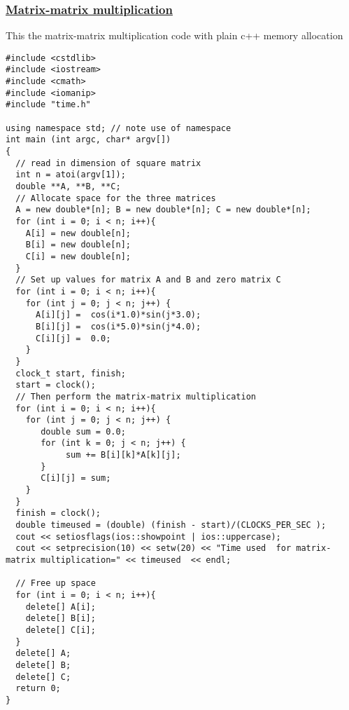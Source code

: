 \documentclass{beamer}
\begin{document}
\begin{frame}
\frametitle{\href{{https://github.com/CompPhysics/ComputationalPhysicsMSU/blob/master/doc/Programs/LecturePrograms/programs/Classes/cpp/program9.cpp}}{Matrix-matrix multiplication}}

This the matrix-matrix multiplication code with plain c++ memory allocation

\begin{Verbatim}[numbers=none,fontsize=\fontsize{9pt}{9pt},baselinestretch=0.95]
#include <cstdlib>
#include <iostream>
#include <cmath>
#include <iomanip>
#include "time.h"

using namespace std; // note use of namespace
int main (int argc, char* argv[])
{
  // read in dimension of square matrix
  int n = atoi(argv[1]);
  double **A, **B, **C;
  // Allocate space for the three matrices
  A = new double*[n]; B = new double*[n]; C = new double*[n];
  for (int i = 0; i < n; i++){
    A[i] = new double[n];
    B[i] = new double[n];
    C[i] = new double[n];
  }
  // Set up values for matrix A and B and zero matrix C
  for (int i = 0; i < n; i++){
    for (int j = 0; j < n; j++) {
      A[i][j] =  cos(i*1.0)*sin(j*3.0);
      B[i][j] =  cos(i*5.0)*sin(j*4.0);
      C[i][j] =  0.0;    
    }
  }
  clock_t start, finish;
  start = clock();
  // Then perform the matrix-matrix multiplication
  for (int i = 0; i < n; i++){
    for (int j = 0; j < n; j++) {
       double sum = 0.0;
       for (int k = 0; j < n; j++) {
            sum += B[i][k]*A[k][j];
       }
       C[i][j] = sum;
    }
  }
  finish = clock();
  double timeused = (double) (finish - start)/(CLOCKS_PER_SEC );
  cout << setiosflags(ios::showpoint | ios::uppercase);
  cout << setprecision(10) << setw(20) << "Time used  for matrix-matrix multiplication=" << timeused  << endl;

  // Free up space
  for (int i = 0; i < n; i++){
    delete[] A[i];
    delete[] B[i];
    delete[] C[i];
  }
  delete[] A;
  delete[] B;
  delete[] C;
  return 0;
}

\end{Verbatim}
\end{frame}
\end{document}
